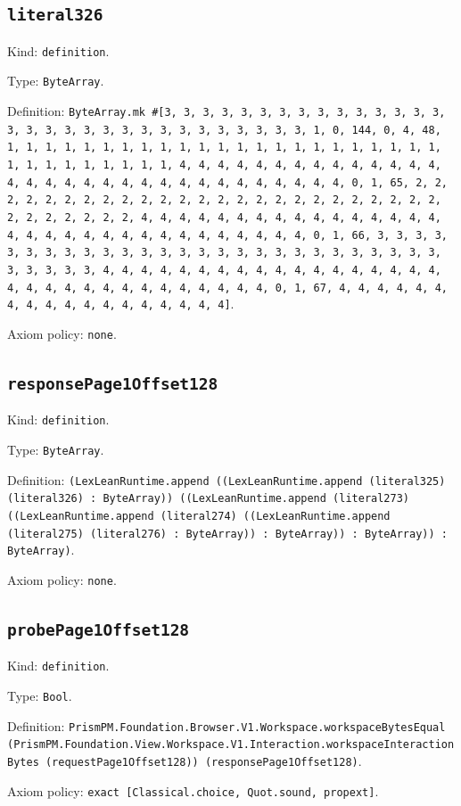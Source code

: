 \documentclass[11pt]{article}
\begin{document}
\subsection*{\texttt{literal326}}
\noindent Kind: \texttt{definition}.\par
\noindent Type: \texttt{ByteArray}.\par
\noindent Definition: \texttt{ByteArray.mk \#[3, 3, 3, 3, 3, 3, 3, 3, 3, 3, 3, 3, 3, 3, 3, 3, 3, 3, 3, 3, 3, 3, 3, 3, 3, 3, 3, 3, 3, 3, 3, 1, 0, 144, 0, 4, 48, 1, 1, 1, 1, 1, 1, 1, 1, 1, 1, 1, 1, 1, 1, 1, 1, 1, 1, 1, 1, 1, 1, 1, 1, 1, 1, 1, 1, 1, 1, 1, 1, 4, 4, 4, 4, 4, 4, 4, 4, 4, 4, 4, 4, 4, 4, 4, 4, 4, 4, 4, 4, 4, 4, 4, 4, 4, 4, 4, 4, 4, 4, 4, 4, 0, 1, 65, 2, 2, 2, 2, 2, 2, 2, 2, 2, 2, 2, 2, 2, 2, 2, 2, 2, 2, 2, 2, 2, 2, 2, 2, 2, 2, 2, 2, 2, 2, 2, 2, 4, 4, 4, 4, 4, 4, 4, 4, 4, 4, 4, 4, 4, 4, 4, 4, 4, 4, 4, 4, 4, 4, 4, 4, 4, 4, 4, 4, 4, 4, 4, 4, 0, 1, 66, 3, 3, 3, 3, 3, 3, 3, 3, 3, 3, 3, 3, 3, 3, 3, 3, 3, 3, 3, 3, 3, 3, 3, 3, 3, 3, 3, 3, 3, 3, 3, 3, 4, 4, 4, 4, 4, 4, 4, 4, 4, 4, 4, 4, 4, 4, 4, 4, 4, 4, 4, 4, 4, 4, 4, 4, 4, 4, 4, 4, 4, 4, 4, 4, 0, 1, 67, 4, 4, 4, 4, 4, 4, 4, 4, 4, 4, 4, 4, 4, 4, 4, 4, 4, 4]}.\par
\noindent Axiom policy: \texttt{none}.\par
\subsection*{\texttt{responsePage1Offset128}}
\noindent Kind: \texttt{definition}.\par
\noindent Type: \texttt{ByteArray}.\par
\noindent Definition: \texttt{(LexLeanRuntime.append ((LexLeanRuntime.append (literal325) (literal326) : ByteArray)) ((LexLeanRuntime.append (literal273) ((LexLeanRuntime.append (literal274) ((LexLeanRuntime.append (literal275) (literal276) : ByteArray)) : ByteArray)) : ByteArray)) : ByteArray)}.\par
\noindent Axiom policy: \texttt{none}.\par
\subsection*{\texttt{probePage1Offset128}}
\noindent Kind: \texttt{definition}.\par
\noindent Type: \texttt{Bool}.\par
\noindent Definition: \texttt{PrismPM.Foundation.Browser.V1.Workspace.workspaceBytesEqual (PrismPM.Foundation.View.Workspace.V1.Interaction.workspaceInteractionBytes (requestPage1Offset128)) (responsePage1Offset128)}.\par
\noindent Axiom policy: \texttt{exact [Classical.choice, Quot.sound, propext]}.\par
\end{document}
